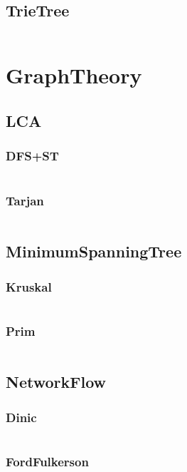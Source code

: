 \documentclass[a4paper,11pt]{article}
\begin{document}
\subsection{TrieTree}
\inputminted[breaklines]{c++}{03++DataStructure/+TrieTree.cpp}

\newpage
\section{GraphTheory}
\subsection{LCA}
\subsubsection{DFS+ST}
\inputminted[breaklines]{c++}{04++GraphTheory/+LCA/+DFS+ST.cpp}
\subsubsection{Tarjan}
\inputminted[breaklines]{c++}{04++GraphTheory/+LCA/+Tarjan.cpp}

\subsection{MinimumSpanningTree}
\subsubsection{Kruskal}
\inputminted[breaklines]{c++}{04++GraphTheory/+MinimumSpanningTree/+Kruskal.cpp}
\subsubsection{Prim}
\inputminted[breaklines]{c++}{04++GraphTheory/+MinimumSpanningTree/+Prim.cpp}

\subsection{NetworkFlow}
\subsubsection{Dinic}
\inputminted[breaklines]{c++}{04++GraphTheory/+NetworkFlow/+Dinic.cpp}
\subsubsection{FordFulkerson}
\inputminted[breaklines]{c++}{04++GraphTheory/+NetworkFlow/+FordFulkerson.cpp}
\end{document}

